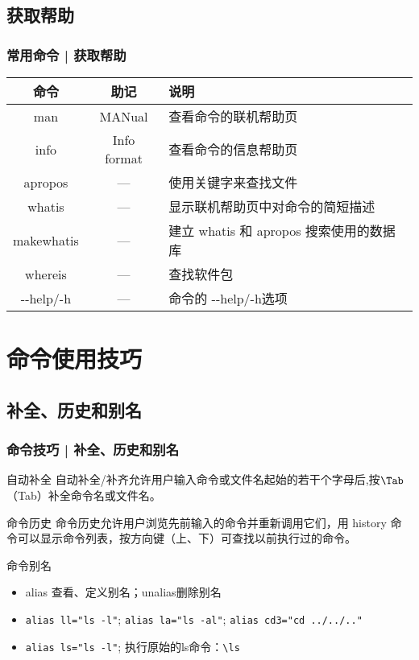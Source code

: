 \subsection{获取帮助}
\begin{frame}[fragile]
  \frametitle{常用命令 | \alert{获取帮助}}
  \begin{table}
    \centering
    \begin{tabularx}{0.9\textwidth}{ccX}
      \hline
      \rowcolor{blue!50}命令 & 助记 & 说明\\
      \hline
      man & MANual & 查看命令的联机帮助页\\
      info & Info format & 查看命令的信息帮助页\\
      apropos & --- & 使用关键字来查找文件\\
      whatis & --- & 显示联机帮助页中对命令的简短描述\\
      makewhatis & --- & 建立 whatis 和 apropos 搜索使用的数据库\\
      whereis & --- & 查找软件包\\
      -\!-help/-h & --- & 命令的 -\!-help/-h选项\\
      \hline
    \end{tabularx}
  \end{table}
\end{frame}


\section{命令使用技巧}
\subsection{补全、历史和别名}
\begin{frame}[fragile]
  \frametitle{命令技巧 | 补全、历史和别名}
  \begin{block}{自动补全}
    自动补全/补齐允许用户输入命令或文件名起始的若干个字母后,按$\Tab$（\alert{Tab}）补全命令名或文件名。
  \end{block}
  \pause
  \begin{block}{命令历史}
    命令历史允许用户浏览先前输入的命令并重新调用它们，用 \alert{history} 命令可以显示命令列表，按方向键（上、下）可查找以前执行过的命令。
  \end{block}
  \pause
  \begin{block}{命令别名}
    \begin{itemize}
      \item \alert{alias} 查看、定义别名；unalias删除别名
      \item \verb|alias ll="ls -l"|; \quad \verb|alias la="ls -al"|; \verb|alias cd3="cd ../../.."|
      \item \verb|alias ls="ls -l"|; 执行原始的ls命令：\verb|\ls|
    \end{itemize}
  \end{block}
\end{frame}


